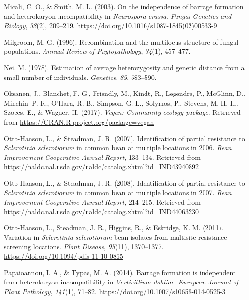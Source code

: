 \documentclass[fleqn,10pt,lineno]{wlpeerj} %
\theoremstyle{definition}
\theoremstyle{definition}
\theoremstyle{definition}
\theoremstyle{remark}
\begin{document}
\hypertarget{ref-micali2003independence}{}
Micali, C. O., \& Smith, M. L. (2003). On the independence of barrage
formation and heterokaryon incompatibility in \emph{Neurospora crassa}.
\emph{Fungal Genetics and Biology}, \emph{38}(2), 209--219.
\url{https://doi.org/10.1016/s1087-1845(02)00533-9}

\hypertarget{ref-milgroom1996recombination}{}
Milgroom, M. G. (1996). Recombination and the multilocus structure of
fungal populations. \emph{Annual Review of Phytopathology},
\emph{34}(1), 457--477.

\hypertarget{ref-nei1978estimation}{}
Nei, M. (1978). Estimation of average heterozygosity and genetic
distance from a small number of individuals. \emph{Genetics}, \emph{89},
583--590.

\hypertarget{ref-vegan}{}
Oksanen, J., Blanchet, F. G., Friendly, M., Kindt, R., Legendre, P.,
McGlinn, D., Minchin, P. R., O'Hara, R. B., Simpson, G. L., Solymos, P.,
Stevens, M. H. H., Szoecs, E., \& Wagner, H. (2017). \emph{Vegan:
Community ecology package}. Retrieved from
\url{https://CRAN.R-project.org/package=vegan}

\hypertarget{ref-otto2007identification}{}
Otto-Hanson, L., \& Steadman, J. R. (2007). Identification of partial
resistance to \emph{Sclerotinia sclerotiorum} in common bean at multiple
locations in 2006. \emph{Bean Improvement Cooperative Annual Report},
133--134. Retrieved from
\url{https://naldc.nal.usda.gov/naldc/catalog.xhtml?id=IND43940892}

\hypertarget{ref-otto2008identification}{}
Otto-Hanson, L., \& Steadman, J. R. (2008). Identification of partial
resistance to \emph{Sclerotinia sclerotiorum} in common bean at multiple
locations in 2007. \emph{Bean Improvement Cooperative Annual Report},
214--215. Retrieved from
\url{https://naldc.nal.usda.gov/naldc/catalog.xhtml?id=IND44063230}

\hypertarget{ref-otto-hanson2011variation}{}
Otto-Hanson, L., Steadman, J. R., Higgins, R., \& Eskridge, K. M.
(2011). Variation in \emph{Sclerotinia sclerotiorum} bean isolates from
multisite resistance screening locations. \emph{Plant Disease},
\emph{95}(11), 1370--1377. \url{https://doi.org/10.1094/pdis-11-10-0865}

\hypertarget{ref-papaioannou2014barrage}{}
Papaioannou, I. A., \& Typas, M. A. (2014). Barrage formation is
independent from heterokaryon incompatibility in \emph{Verticillium
dahliae}. \emph{European Journal of Plant Pathology}, \emph{141}(1),
71--82. \url{https://doi.org/10.1007/s10658-014-0525-3}
\end{document}
